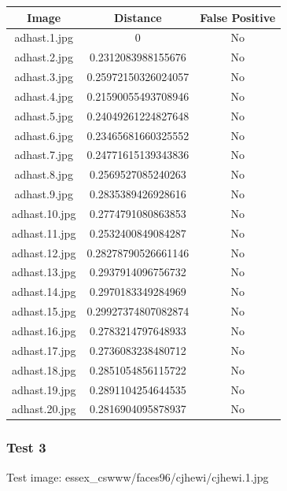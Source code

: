 \documentclass[12pt]{article}
\begin{document}
\begin{center}
\begin{tabular}{ccc}
Image & Distance & False Positive \\
\hline
adhast.1.jpg & 0 & No \\
adhast.2.jpg & 0.2312083988155676 & No \\
adhast.3.jpg & 0.25972150326024057 & No \\
adhast.4.jpg & 0.21590055493708946 & No \\
adhast.5.jpg & 0.24049261224827648 & No \\
adhast.6.jpg & 0.23465681660325552 & No \\
adhast.7.jpg & 0.24771615139343836 & No \\
adhast.8.jpg & 0.2569527085240263 & No \\
adhast.9.jpg & 0.2835389426928616 & No \\
adhast.10.jpg & 0.2774791080863853 & No \\
adhast.11.jpg & 0.2532400849084287 & No \\
adhast.12.jpg & 0.28278790526661146 & No \\
adhast.13.jpg & 0.2937914096756732 & No \\
adhast.14.jpg & 0.2970183349284969 & No \\
adhast.15.jpg & 0.29927374807082874 & No \\
adhast.16.jpg & 0.2783214797648933 & No \\
adhast.17.jpg & 0.2736083238480712 & No \\
adhast.18.jpg & 0.2851054856115722 & No \\
adhast.19.jpg & 0.2891104254644535 & No \\
adhast.20.jpg & 0.2816904095878937 & No \\
\end{tabular}
\end{center}

\newpage
\subsubsection{Test 3}
Test image: essex\_cswww/faces96/cjhewi/cjhewi.1.jpg
\end{document}
